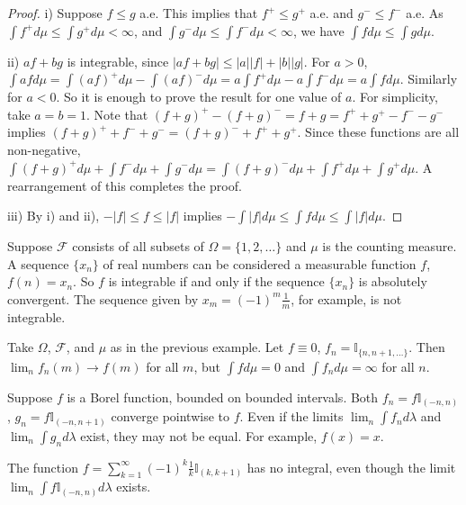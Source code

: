 \documentclass[11pt,fleqn]{book} %
\begin{document}
\begin{proof}
	i) Suppose $f \leq g$ a.e. This implies that $f^+ \leq g^+$ a.e. and $g^- \leq f^-$ a.e. As $\int f^+ d\mu \leq \int g^+ d\mu < \infty$, and $\int g^- d\mu \leq \int f^- d\mu < \infty$, we have $\int f d\mu \leq \int g d\mu$.

	ii) $af+bg$ is integrable, since $|af+bg| \leq |a||f| + |b||g|$. For $a>0$, $\int af d\mu = \int (af)^+ d\mu - \int (af)^- d\mu = a \int f^+ d\mu - a \int f^- d\mu = a \int f d\mu$. Similarly for $a < 0$. So it is enough to prove the result for one value of $a$. For simplicity, take $a=b=1$. Note that $(f+g)^+ - (f+g)^- = f+g = f^+ + g^+ - f^- - g^-$ implies $(f+g)^+ + f^- + g^- = (f+g)^- + f^+ + g^+$. Since these functions are all non-negative, $\int (f+g)^+ d\mu + \int f^- d\mu + \int g^- d\mu = \int (f+g)^- d\mu + \int f^+ d\mu + \int g^+ d\mu$. A rearrangement of this completes the proof.

	iii) By i) and ii), $-|f| \leq f \leq |f|$ implies $- \int |f| d\mu \leq \int f d\mu \leq \int |f| d\mu$.
\end{proof}

\begin{example}
	Suppose $\mathcal{F}$ consists of all subsets of $\Omega = \{1,2,\dots\}$ and $\mu$ is the counting measure. A sequence $\{x_n\}$ of real numbers can be considered a measurable function $f$, $f(n) = x_n$. So $f$ is integrable if and only if the sequence $\{x_n\}$ is absolutely convergent. The sequence given by $x_m = (-1)^m \frac{1}{m}$, for example, is not integrable.
\end{example}

\begin{example}
	Take $\Omega$, $\mathcal{F}$, and $\mu$ as in the previous example. Let $f \equiv 0$, $f_n = \mathbb{I}_{\{n,n+1,\dots\}}$. Then $\lim_n f_n(m) \to f(m)$ for all $m$, but $\int f d\mu = 0$ and $\int f_n d\mu = \infty$ for all $n$.
\end{example}

\begin{example}
	Suppose $f$ is a Borel function, bounded on bounded intervals. Both $f_n = f\mathbb{I}_{(-n,n)}$, $g_n = f\mathbb{I}_{(-n,n+1)}$ converge pointwise to $f$. Even if the limits $\lim_n \int f_n d\lambda$ and $\lim_n \int g_n d\lambda$ exist, they may not be equal. For example, $f(x)=x$.
\end{example}

\begin{example}
	The function $f = \sum_{k=1}^\infty (-1)^k \frac{1}{k} \mathbb{I}_{(k,k+1)}$ has no integral, even though the limit $\lim_n \int f \mathbb{I}_{(-n,n)} d\lambda$ exists.
\end{example}
\end{document}
